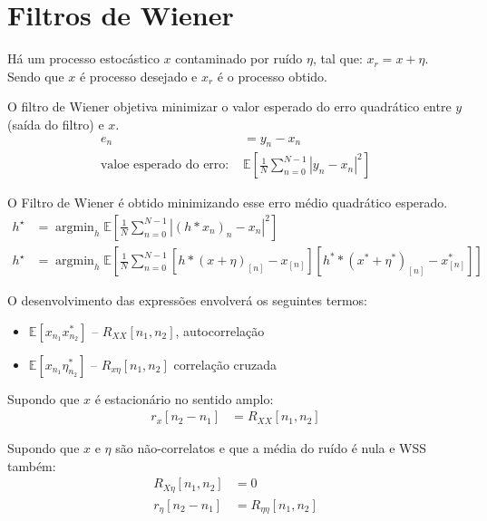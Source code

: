 \documentclass{article}
\DeclareMathOperator*{\argmin}{argmin} %
\begin{document}
\setlength{\abovedisplayskip}{12pt}
\setlength{\belowdisplayskip}{0.75em}
\setlength{\abovedisplayshortskip}{0pt}
\setlength{\belowdisplayshortskip}{0pt}
\setlength{\jot}{1pt}

\section{Filtros de Wiener}
Há um processo estocástico $x$ contaminado por ruído $\eta$, tal que: $x_r = x + \eta$. Sendo que
$x$ é processo desejado e $x_r$ é o processo obtido.

O filtro de Wiener objetiva minimizar o valor esperado do erro quadrático entre $y$ (saída do
filtro) e $x$.
\begin{align*}
    e_n &= y_n - x_n \\
    \text{valoe esperado do erro: } &\mathbb{E}\left[\frac{1}{N} \sum_{n=0}^{N-1} |y_n - x_n|^2\right]
\end{align*}

O Filtro de Wiener é obtido minimizando esse erro médio quadrático esperado.
\begin{align*}
    h^{\star} &= \argmin_{h} \mathbb{E}\left[ \frac{1}{N} \sum_{n=0}^{N-1} | (h*x_n)_n - x_n |^2 \right] \\
    h^{\star} &= \argmin_{h} \mathbb{E}\left[ \frac{1}{N} \sum_{n=0}^{N-1}
    [h*(x+\eta)_{[n]}-x_{[n]}] [h^* * (x^* + \eta^*)_{[n]} - x_{[n]}^*] \right]
\end{align*}

O desenvolvimento das expressões envolverá os seguintes termos:
\begin{itemize}
    \item $\mathbb{E}[x_{n_1}x_{n_2}^*]$ -- $R_{XX}[n_1, n_2]$, autocorrelação
    \item $\mathbb{E}[x_{n_1}\eta_{n_2}^*]$ -- $R_{x\eta}[n_1,n_2]$ correlação cruzada
\end{itemize}

Supondo que $x$ é estacionário no sentido amplo:
\begin{align*}
    r_x[n_2-n_1] &= R_{XX}[n_1,n_2]
\end{align*}

Supondo que $x$ e $\eta$ são não-correlatos e que a média do ruído é nula e WSS também:
\begin{align*}
    R_{X\eta}[n_1,n_2] &= 0 \\
    r_{\eta}[n_2-n_1] &= R_{\eta\eta}[n_1,n_2]
\end{align*}
\end{document}
